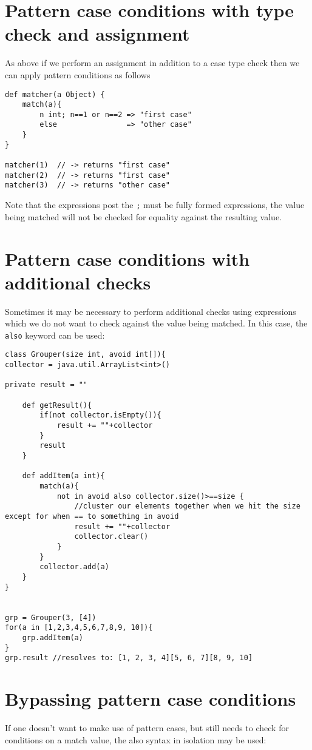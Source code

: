 \documentclass[conc-doc]{subfiles}
\begin{document}
\section{Pattern case conditions with type check and assignment}
As above if we perform an assignment in addition to a case type check then we can apply pattern conditions as follows

\begin{lstlisting}
def matcher(a Object) {
	match(a){
		n int; n==1 or n==2 => "first case"
		else                => "other case"
	}
}

matcher(1)  // -> returns "first case"
matcher(2)  // -> returns "first case"
matcher(3)  // -> returns "other case"
\end{lstlisting}

Note that the expressions post the \lstinline{;} must be fully formed expressions, the value being matched will not be checked for equality against the resulting value.

\section{Pattern case conditions with additional checks}
Sometimes it may be necessary to perform additional checks using expressions which we do not want to check against the value being matched. In this case, the \lstinline{also} keyword can be used:


\begin{lstlisting}
class Grouper(size int, avoid int[]){
collector = java.util.ArrayList<int>()

private result = ""

	def getResult(){
		if(not collector.isEmpty()){
			result += ""+collector 
		}
		result
	}

	def addItem(a int){
		match(a){
			not in avoid also collector.size()>==size {
				//cluster our elements together when we hit the size except for when == to something in avoid
				result += ""+collector
				collector.clear()
			}
		}
		collector.add(a)
	}
}


grp = Grouper(3, [4])
for(a in [1,2,3,4,5,6,7,8,9, 10]){
	grp.addItem(a)
}
grp.result //resolves to: [1, 2, 3, 4][5, 6, 7][8, 9, 10]
\end{lstlisting}

\section{Bypassing pattern case conditions}
If one doesn't want to make use of pattern cases, but still needs to check for conditions on a match value, the also syntax in isolation may be used:
\end{document}
